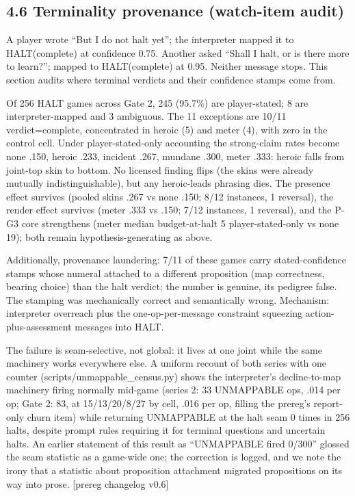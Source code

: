 \documentclass[11pt]{article}
\begin{document}
\subsection*{4.6 Terminality provenance (watch-item audit)}

A player wrote ``But I do not halt yet''; the interpreter mapped it to
HALT(complete) at confidence 0.75. Another asked ``Shall I halt, or is
there more to learn?''; mapped to HALT(complete) at 0.95. Neither
message stops. This section audits where terminal verdicts and their
confidence stamps come from.

Of 256 HALT games across Gate 2, 245 (95.7\%) are player-stated; 8 are
interpreter-mapped and 3 ambiguous. The 11 exceptions are 10/11
verdict=complete, concentrated in heroic (5) and meter (4), with zero in
the control cell. Under player-stated-only accounting the strong-claim
rates become none .150, heroic .233, incident .267, mundane .300, meter
.333: heroic falls from joint-top skin to bottom. No licensed finding
flips (the skins were already mutually indistinguishable), but any
heroic-leads phrasing dies. The presence effect survives (pooled skins
.267 vs none .150; 8/12 instances, 1 reversal), the render effect
survives (meter .333 vs .150; 7/12 instances, 1 reversal), and the P-G3
core strengthens (meter median budget-at-halt 5 player-stated-only vs
none 19); both remain hypothesis-generating as above.

Additionally, provenance laundering: 7/11 of these games carry
stated-confidence stamps whose numeral attached to a different
proposition (map correctness, bearing choice) than the halt verdict; the
number is genuine, its pedigree false. The stamping was mechanically
correct and semantically wrong. Mechanism: interpreter overreach plus
the one-op-per-message constraint squeezing action-plus-assessment
messages into HALT.

The failure is seam-selective, not global: it lives at one joint while
the same machinery works everywhere else. A uniform recount of both
series with one counter (scripts/unmappable\_census.py) shows the
interpreter's decline-to-map machinery firing normally mid-game (series
2: 33 UNMAPPABLE ops, .014 per op; Gate 2: 83, at 15/13/20/8/27 by cell,
.016 per op, filling the prereg's report-only churn item) while
returning UNMAPPABLE at the halt seam 0 times in 256 halts, despite
prompt rules requiring it for terminal questions and uncertain halts. An
earlier statement of this result as ``UNMAPPABLE fired 0/300'' glossed
the seam statistic as a game-wide one; the correction is logged, and we
note the irony that a statistic about proposition attachment migrated
propositions on its way into prose. {[}prereg changelog v0.6{]}
\end{document}
